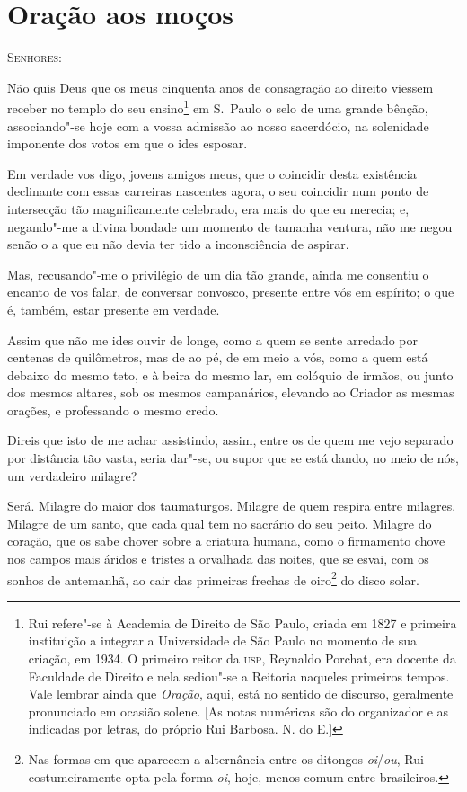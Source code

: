 \chapter*{Oração aos moços}

\textsc{Senhores:}

Não quis Deus que os meus cinquenta anos de consagração ao direito
viessem receber no templo do seu ensino\footnote{ Rui refere"-se à
Academia de Direito de São Paulo, criada em 1827 e primeira
instituição a integrar a Universidade de São Paulo no momento de sua
criação, em 1934. O primeiro reitor da \textsc{usp}, Reynaldo Porchat,
era docente da Faculdade de Direito e nela sediou"-se a Reitoria
naqueles primeiros tempos. Vale lembrar ainda que \textit{Oração}, aqui, 
está no sentido de discurso, geralmente pronunciado em ocasião solene. [As notas numéricas são 
do organizador e as indicadas por letras, do próprio Rui Barbosa. N. do E.]} 
em S.~Paulo o selo de uma grande bênção, associando"-se hoje com a 
vossa admissão ao nosso sacerdócio, na solenidade imponente dos votos em que o ides esposar.

Em verdade vos digo, jovens amigos meus, que o coincidir desta
existência declinante com essas carreiras nascentes agora, o seu
coincidir num ponto de intersecção tão magnificamente celebrado, era
mais do que eu merecia; e, negando"-me a divina bondade um momento de
tamanha ventura, não me negou senão o a que eu não devia ter tido a
inconsciência de aspirar.

Mas, recusando"-me o privilégio de um dia tão grande, ainda me
consentiu o encanto de vos falar, de conversar convosco, presente entre
vós em espírito; o que é, também, estar presente em verdade.

Assim que não me ides ouvir de longe, como a quem se sente
arredado por centenas de quilômetros, mas de ao pé, de em meio a vós,
como a quem está debaixo do mesmo teto, e à beira do mesmo lar, em
colóquio de irmãos, ou junto dos mesmos altares, sob os mesmos
campanários, elevando ao Criador as mesmas orações, e professando o
mesmo credo.

Direis que isto de me achar assistindo, assim, entre os de quem me
vejo separado por distância tão vasta, seria dar"-se, ou supor que se
está dando, no meio de nós, um verdadeiro milagre?

Será. Milagre do maior dos taumaturgos. Milagre de quem respira
entre milagres. Milagre de um santo, que cada qual tem no sacrário do
seu peito. Milagre do coração, que os sabe chover sobre a criatura
humana, como o firmamento chove nos campos mais áridos e tristes a
orvalhada das noites, que se esvai, com os sonhos de antemanhã, ao cair
das primeiras frechas de oiro\footnote{ Nas formas em que aparecem a
alternância entre os ditongos \textit{oi}/\textit{ou}, Rui
costumeiramente opta pela forma \textit{oi}, hoje, menos comum entre
brasileiros.} do disco solar.

